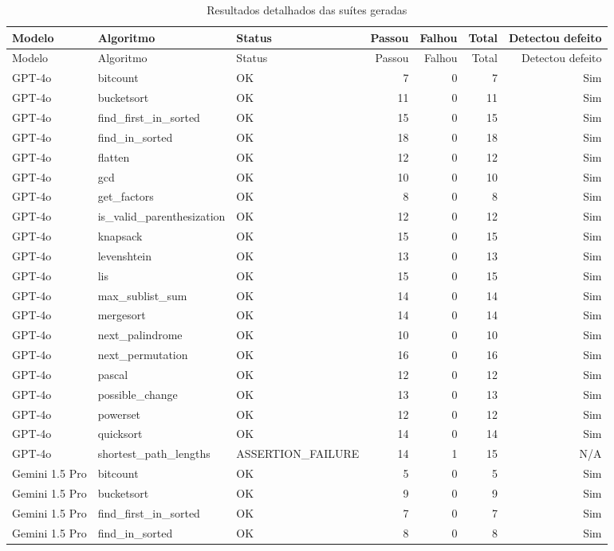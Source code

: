 \begin{longtable}{lllrrrr}
\caption{Resultados detalhados das suítes geradas}\label{tab:resultados-detalhados}\\
\toprule
Modelo & Algoritmo & Status & Passou & Falhou & Total & Detectou defeito \\
\midrule
\endfirsthead
\toprule
Modelo & Algoritmo & Status & Passou & Falhou & Total & Detectou defeito \\
\midrule
\endhead
GPT-4o & bitcount & OK & 7 & 0 & 7 & Sim \\
GPT-4o & bucketsort & OK & 11 & 0 & 11 & Sim \\
GPT-4o & find\_first\_in\_sorted & OK & 15 & 0 & 15 & Sim \\
GPT-4o & find\_in\_sorted & OK & 18 & 0 & 18 & Sim \\
GPT-4o & flatten & OK & 12 & 0 & 12 & Sim \\
GPT-4o & gcd & OK & 10 & 0 & 10 & Sim \\
GPT-4o & get\_factors & OK & 8 & 0 & 8 & Sim \\
GPT-4o & is\_valid\_parenthesization & OK & 12 & 0 & 12 & Sim \\
GPT-4o & knapsack & OK & 15 & 0 & 15 & Sim \\
GPT-4o & levenshtein & OK & 13 & 0 & 13 & Sim \\
GPT-4o & lis & OK & 15 & 0 & 15 & Sim \\
GPT-4o & max\_sublist\_sum & OK & 14 & 0 & 14 & Sim \\
GPT-4o & mergesort & OK & 14 & 0 & 14 & Sim \\
GPT-4o & next\_palindrome & OK & 10 & 0 & 10 & Sim \\
GPT-4o & next\_permutation & OK & 16 & 0 & 16 & Sim \\
GPT-4o & pascal & OK & 12 & 0 & 12 & Sim \\
GPT-4o & possible\_change & OK & 13 & 0 & 13 & Sim \\
GPT-4o & powerset & OK & 12 & 0 & 12 & Sim \\
GPT-4o & quicksort & OK & 14 & 0 & 14 & Sim \\
GPT-4o & shortest\_path\_lengths & ASSERTION\_FAILURE & 14 & 1 & 15 & N/A \\
Gemini 1.5 Pro & bitcount & OK & 5 & 0 & 5 & Sim \\
Gemini 1.5 Pro & bucketsort & OK & 9 & 0 & 9 & Sim \\
Gemini 1.5 Pro & find\_first\_in\_sorted & OK & 7 & 0 & 7 & Sim \\
Gemini 1.5 Pro & find\_in\_sorted & OK & 8 & 0 & 8 & Sim \\

\end{longtable}
